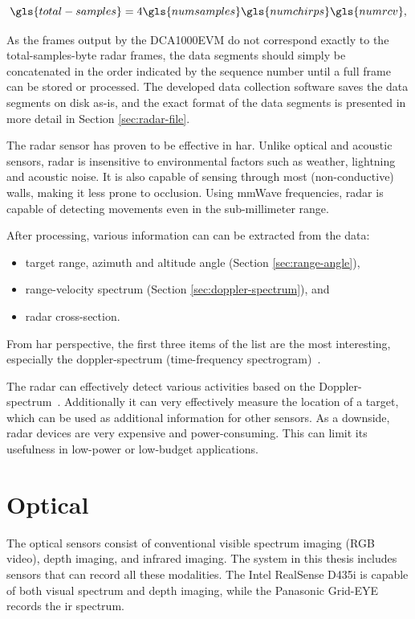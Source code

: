 \begin{equation}
\label{eq:bytes-per-frame}
    \gls{total-samples} = 4 \gls{numsamples} \gls{numchirps}  \gls{numrcv},
\end{equation}


As the frames output by the DCA1000EVM do not correspond exactly to the \gls{total-samples}-byte radar frames,
the data segments should simply be concatenated in the order indicated by the sequence number until a full frame can be stored or processed.
The developed data collection software saves the data segments on disk as-is,
and the exact format of the data segments is presented in more detail in Section \ref{sec:radar-file}.

The radar sensor has proven to be effective in \gls{har}.
Unlike optical and acoustic sensors,
radar is insensitive to environmental factors such as weather, lightning and acoustic noise.
It is also capable of sensing through most (non-conductive) walls,
making it less prone to occlusion.
Using \gls{mmWave} frequencies, radar is capable of detecting movements even in the sub-millimeter range.

After processing, various information can can be extracted from the data:
\begin{itemize}
    \item target range, azimuth and altitude angle (Section \ref{sec:range-angle}),
    \item range-velocity spectrum (Section \ref{sec:doppler-spectrum}), and
    \item radar cross-section.
\end{itemize}
From \gls{har} perspective, the first three items of the list are the most interesting,
especially the doppler-spectrum (time-frequency spectrogram)~\cite{sensing-survey}.

The radar can effectively detect various activities based on the Doppler-spectrum~\cite{bumblebee-micro-doppler-har, seifert19, liu12, kim16}.
Additionally it can very effectively measure the location of a target,
which can be used as additional information for other sensors.
As a downside, radar devices are very expensive and power-consuming.
This can limit its usefulness in low-power or low-budget applications.

\section{Optical}
The optical sensors consist of conventional visible spectrum imaging (RGB video),
depth imaging, and infrared imaging.
The system in this thesis includes sensors that can record all these modalities.
The Intel RealSense D435i is capable of both visual spectrum and depth imaging,
while the Panasonic Grid-EYE records the \gls{ir} spectrum.

